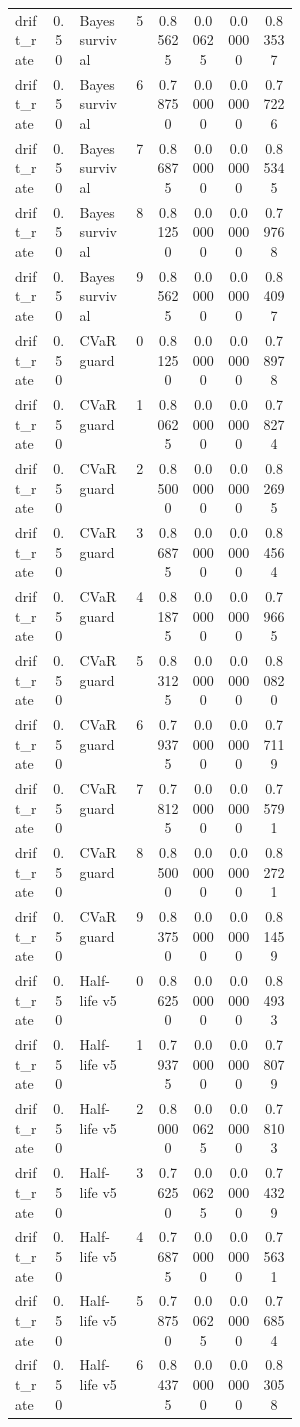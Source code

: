 \documentclass{article}
\begin{document}
\begin{center}
\begin{longtable}{p{0.13\linewidth}cp{0.20\linewidth}ccccc}
drift\_rate & 0.50 & Bayes survival & 5 & 0.85625 & 0.00625 & 0.00000 & 0.83537\\
drift\_rate & 0.50 & Bayes survival & 6 & 0.78750 & 0.00000 & 0.00000 & 0.77226\\
drift\_rate & 0.50 & Bayes survival & 7 & 0.86875 & 0.00000 & 0.00000 & 0.85345\\
drift\_rate & 0.50 & Bayes survival & 8 & 0.81250 & 0.00000 & 0.00000 & 0.79768\\
drift\_rate & 0.50 & Bayes survival & 9 & 0.85625 & 0.00000 & 0.00000 & 0.84097\\
drift\_rate & 0.50 & CVaR guard & 0 & 0.81250 & 0.00000 & 0.00000 & 0.78978\\
drift\_rate & 0.50 & CVaR guard & 1 & 0.80625 & 0.00000 & 0.00000 & 0.78274\\
drift\_rate & 0.50 & CVaR guard & 2 & 0.85000 & 0.00000 & 0.00000 & 0.82695\\
drift\_rate & 0.50 & CVaR guard & 3 & 0.86875 & 0.00000 & 0.00000 & 0.84564\\
drift\_rate & 0.50 & CVaR guard & 4 & 0.81875 & 0.00000 & 0.00000 & 0.79665\\
drift\_rate & 0.50 & CVaR guard & 5 & 0.83125 & 0.00000 & 0.00000 & 0.80820\\
drift\_rate & 0.50 & CVaR guard & 6 & 0.79375 & 0.00000 & 0.00000 & 0.77119\\
drift\_rate & 0.50 & CVaR guard & 7 & 0.78125 & 0.00000 & 0.00000 & 0.75791\\
drift\_rate & 0.50 & CVaR guard & 8 & 0.85000 & 0.00000 & 0.00000 & 0.82721\\
drift\_rate & 0.50 & CVaR guard & 9 & 0.83750 & 0.00000 & 0.00000 & 0.81459\\
drift\_rate & 0.50 & Half-life v5 & 0 & 0.86250 & 0.00000 & 0.00000 & 0.84933\\
drift\_rate & 0.50 & Half-life v5 & 1 & 0.79375 & 0.00000 & 0.00000 & 0.78079\\
drift\_rate & 0.50 & Half-life v5 & 2 & 0.80000 & 0.00625 & 0.00000 & 0.78103\\
drift\_rate & 0.50 & Half-life v5 & 3 & 0.76250 & 0.00625 & 0.00000 & 0.74329\\
drift\_rate & 0.50 & Half-life v5 & 4 & 0.76875 & 0.00000 & 0.00000 & 0.75631\\
drift\_rate & 0.50 & Half-life v5 & 5 & 0.78750 & 0.00625 & 0.00000 & 0.76854\\
drift\_rate & 0.50 & Half-life v5 & 6 & 0.84375 & 0.00000 & 0.00000 & 0.83058\\

\end{longtable}
\end{center}
\end{document}
